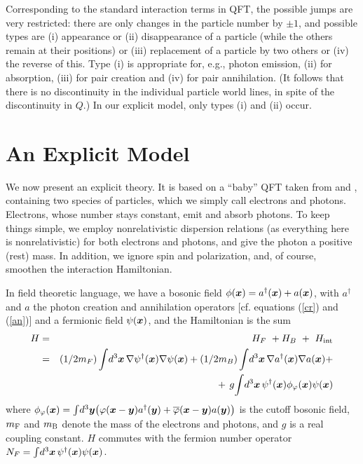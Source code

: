 \documentclass[12pt]{article}
\begin{document}
Corresponding to the standard interaction terms in QFT, the possible jumps
are very restricted: there are only changes in the particle number by $\pm 1$,
and possible types are (i) appearance or (ii) disappearance of a particle
(while the others remain at their positions) or (iii) replacement of a
particle by two others or (iv) the reverse of this. Type (i) is
appropriate for, e.g., photon emission, (ii) for absorption, (iii) for pair
creation and (iv) for pair annihilation. (It follows that there is no
discontinuity in the individual particle world lines, in spite of the
discontinuity in $Q$.)  In our explicit model, only types (i) and (ii)
occur.


\section{An Explicit Model}

We now present an explicit theory. It is based on a ``baby'' QFT taken
from \cite[p.~339]{Schweber} and \cite{Nelson}, containing two species
of particles, which we simply call electrons and photons. Electrons,
whose number stays constant, emit and absorb photons. To keep things
simple, we employ nonrelativistic dispersion relations (as everything
here is nonrelativistic) for both electrons and photons, and give the
photon a positive (rest) mass. In addition, we ignore spin and
polarization, and, of course, smoothen the interaction Hamiltonian.

In field theoretic language, we have a bosonic field $\phi(\boldsymbol{x}) =
a^{\dag}(\boldsymbol{x}) + a(\boldsymbol{x})$, with $a^{\dag}$ and $a$ the photon creation
and annihilation operators [cf. equations (\ref{cr}) and (\ref{an})]
and a fermionic field $\psi(\boldsymbol{x})$, and the Hamiltonian is the sum
\begin{eqnarray}\nonumber
  H&=&H_{F}\ + H_{B}\ +\ H_{\mathrm{int}} \\\nonumber
  &=&(1/2m_F) \int\!d^3\boldsymbol{x}\,\nabla \psi^{\dag}(\boldsymbol{x})\nabla \psi(\boldsymbol{x})
  +(1/2m_B) \int\!d^3\boldsymbol{x}\,\nabla a^{\dag}(\boldsymbol{x})\nabla a(\boldsymbol{x}) + \\\nonumber 
  &\quad&\qquad {} + \,g\!\int \!d^3\boldsymbol{x}\, \psi^{\dag}(\boldsymbol{x}) \phi_{\varphi}
  (\boldsymbol{x}) \psi(\boldsymbol{x})
\end{eqnarray}
where $\phi_{\varphi}(\boldsymbol{x})= \int\!d^3\boldsymbol y\big(\varphi(\boldsymbol{x}-\boldsymbol y)
a^{\dag}(\boldsymbol y) + \overline{\varphi}(\boldsymbol{x}-\boldsymbol y)a(\boldsymbol y)\big)$ is the cutoff
bosonic field, $m_{\mathrm{F}}$ and $m_{\mathrm{B}}$ denote the mass of the electrons
and photons, and $g$ is a real coupling constant.  $H$ commutes with
the fermion number operator $N_F =\int\!d^3\boldsymbol{x}\,
\psi^{\dag}(\boldsymbol{x})\psi(\boldsymbol{x})$.
\end{document}
